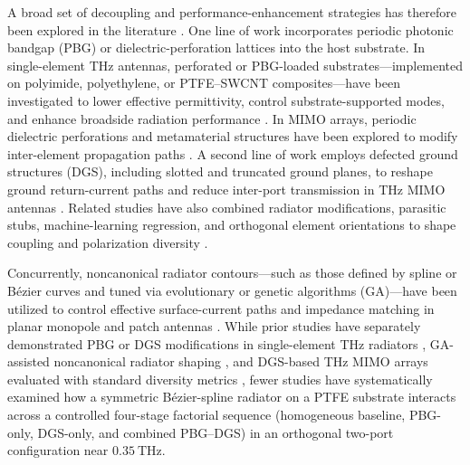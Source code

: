 \documentclass[referee,pdflatex,sn-mathphys-ay]{sn-jnl}
\begin{document}
A broad set of decoupling and performance-enhancement strategies has therefore been explored in the literature \citep{IsolationReview2025}. One line of work incorporates periodic photonic bandgap (PBG) or dielectric-perforation lattices into the host substrate. In single-element THz antennas, perforated or PBG-loaded substrates---implemented on polyimide, polyethylene, or PTFE--SWCNT composites---have been investigated to lower effective permittivity, control substrate-supported modes, and enhance broadside radiation performance \citep{khezzar_pbg_2021,li_triband_2024,babaahmed_hybrid_2025,bouzid_pbg_2025,boujmil_pbg_2025,reguig_pbg_ml_2026}. In MIMO arrays, periodic dielectric perforations and metamaterial structures have been explored to modify inter-element propagation paths \citep{tripathi2023,alibakhshikenari2019a,boujmil2025_rio}. A second line of work employs defected ground structures (DGS), including slotted and truncated ground planes, to reshape ground return-current paths and reduce inter-port transmission in THz MIMO antennas \citep{heliyon2024,kumari2024,singh2022,azzouz2026_rio}. Related studies have also combined radiator modifications, parasitic stubs, machine-learning regression, and orthogonal element orientations to shape coupling and polarization diversity \citep{nirob2025,heliyon2024,singh2022,douhi2025,OrientationStudy2023,taher2023,haque2026}.

Concurrently, noncanonical radiator contours---such as those defined by spline or B\'ezier curves and tuned via evolutionary or genetic algorithms (GA)---have been utilized to control effective surface-current paths and impedance matching in planar monopole and patch antennas \citep{marouf_bezier_2023,Bekasiewicz2021,Prasetyo2023ISAP,Prasetyo2023PIERS}. While prior studies have separately demonstrated PBG or DGS modifications in single-element THz radiators \citep{khezzar_pbg_2021,babaahmed_hybrid_2025,bouzid_pbg_2025}, GA-assisted noncanonical radiator shaping \citep{marouf_bezier_2023,Prasetyo2023ISAP}, and DGS-based THz MIMO arrays evaluated with standard diversity metrics \citep{babu2021,heliyon2024,singh2022,amraoui2024_sciaf}, fewer studies have systematically examined how a symmetric B\'ezier-spline radiator on a PTFE substrate interacts across a controlled four-stage factorial sequence (homogeneous baseline, PBG-only, DGS-only, and combined PBG--DGS) in an orthogonal two-port configuration near \(0.35~\mathrm{THz}\).
\end{document}
